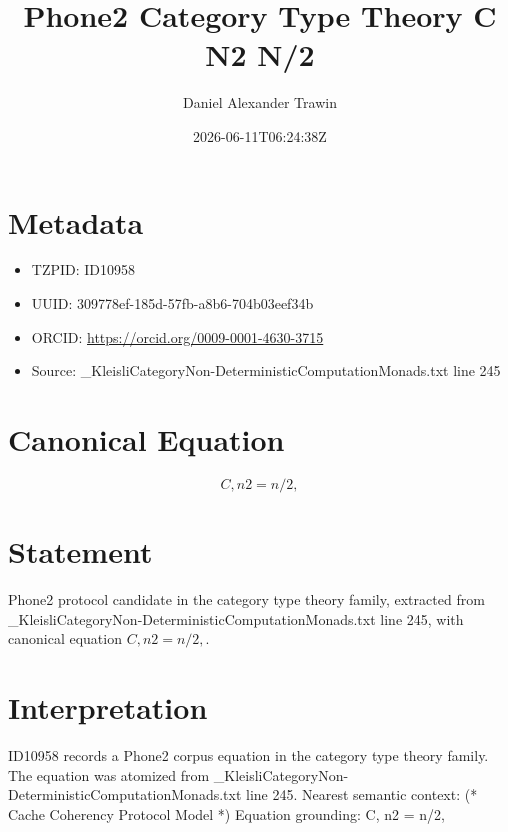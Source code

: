 \documentclass[11pt]{article}
\title{Phone2 Category Type Theory C N2 N/2}
\author{Daniel Alexander Trawin}
\date{2026-06-11T06:24:38Z}
\begin{document}
\maketitle
\section*{Metadata}
\begin{itemize}
\item TZPID: ID10958
\item UUID: 309778ef-185d-57fb-a8b6-704b03eef34b
\item ORCID: \url{https://orcid.org/0009-0001-4630-3715}
\item Source: _KleisliCategoryNon-DeterministicComputationMonads.txt line 245
\end{itemize}
\section*{Canonical Equation}
\[
{C, n2 = n/2},
\]
\section*{Statement}
Phone2 protocol candidate in the category type theory family, extracted from _KleisliCategoryNon-DeterministicComputationMonads.txt line 245, with canonical equation ${C, n2 = n/2},$.
\section*{Interpretation}
ID10958 records a Phone2 corpus equation in the category type theory family. The equation was atomized from _KleisliCategoryNon-DeterministicComputationMonads.txt line 245. Nearest semantic context: (* Cache Coherency Protocol Model *) Equation grounding: {C, n2 = n/2},
\end{document}
